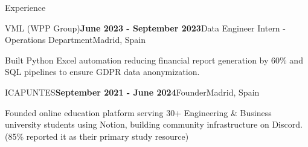 \documentclass[
	11pt, %
]{resume} %
\begin{document}
\begin{rSection}{Experience}
    \begin{rSubsection}{VML (WPP Group)}{\textbf{June 2023 - September 2023}}{Data Engineer Intern - Operations Department}{Madrid, Spain}
        \item Built Python Excel automation reducing financial report generation by 60\% and SQL pipelines to ensure GDPR data anonymization.
    \end{rSubsection}

    \begin{rSubsection}{ICAPUNTES}{\textbf{September 2021 - June 2024}}{Founder}{Madrid, Spain}
        \item Founded online education platform serving 30+ Engineering \& Business university students using Notion, building community infrastructure on Discord. (85\% reported it as their primary study resource)
    \end{rSubsection}
\end{rSection}


\end{document}
